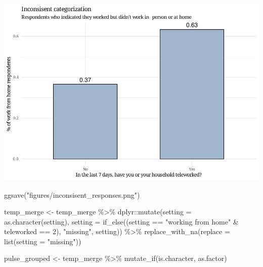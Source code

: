 \documentclass[
]{article}
\newenvironment{Shaded}{\begin{snugshade}}{\end{snugshade}}
\newcommand{\AttributeTok}[1]{\textcolor[rgb]{0.77,0.63,0.00}{#1}}
\newcommand{\DecValTok}[1]{\textcolor[rgb]{0.00,0.00,0.81}{#1}}
\newcommand{\FunctionTok}[1]{\textcolor[rgb]{0.00,0.00,0.00}{#1}}
\newcommand{\NormalTok}[1]{#1}
\newcommand{\OtherTok}[1]{\textcolor[rgb]{0.56,0.35,0.01}{#1}}
\newcommand{\SpecialCharTok}[1]{\textcolor[rgb]{0.00,0.00,0.00}{#1}}
\newcommand{\StringTok}[1]{\textcolor[rgb]{0.31,0.60,0.02}{#1}}
\begin{document}
\includegraphics{risk_of_infection_files/figure-latex/unnamed-chunk-12-1.pdf}

\begin{Shaded}
\begin{Highlighting}[]
\FunctionTok{ggsave}\NormalTok{(}\StringTok{"figures/inconsisent\_responses.png"}\NormalTok{)}
\end{Highlighting}
\end{Shaded}

\begin{Shaded}
\begin{Highlighting}[]
\NormalTok{temp\_merge }\OtherTok{\textless{}{-}}\NormalTok{ temp\_merge }\SpecialCharTok{\%\textgreater{}\%} 
\NormalTok{  dplyr}\SpecialCharTok{::}\FunctionTok{mutate}\NormalTok{(}\AttributeTok{setting =} \FunctionTok{as.character}\NormalTok{(setting),}
                \AttributeTok{setting =} \FunctionTok{if\_else}\NormalTok{((setting }\SpecialCharTok{==} \StringTok{"working from home"} \SpecialCharTok{\&}\NormalTok{ teleworked }\SpecialCharTok{==} \DecValTok{2}\NormalTok{),}
                                  \StringTok{"missing"}\NormalTok{,}
\NormalTok{                                  setting)) }\SpecialCharTok{\%\textgreater{}\%}
  \FunctionTok{replace\_with\_na}\NormalTok{(}\AttributeTok{replace =} \FunctionTok{list}\NormalTok{(}\AttributeTok{setting =} \StringTok{"missing"}\NormalTok{))}
\end{Highlighting}
\end{Shaded}

\begin{Shaded}
\begin{Highlighting}[]
\NormalTok{pulse\_grouped }\OtherTok{\textless{}{-}}\NormalTok{ temp\_merge }\SpecialCharTok{\%\textgreater{}\%}
  \FunctionTok{mutate\_if}\NormalTok{(is.character, as.factor)}
\end{Highlighting}
\end{Shaded}
\end{document}
